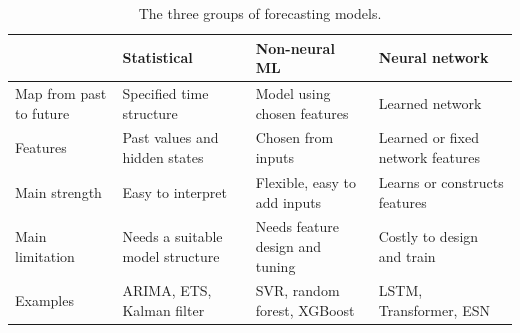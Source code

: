 \begin{table}[!htb]
\centering
\caption[Three groups of forecasting models]{The three groups of
forecasting models.}
\label{tab:model-groups}
\small
\begin{tabular}{@{}L{2.7cm}L{3.25cm}L{3.25cm}L{3.25cm}@{}}
\toprule
 & \textbf{Statistical} & \textbf{Non-neural ML} & \textbf{Neural network} \\
\midrule
Map from past to future
 & Specified time structure & Model using chosen features & Learned network \\
\addlinespace
Features
 & Past values and hidden states & Chosen from inputs & Learned or fixed network features \\
\addlinespace
Main strength
 & Easy to interpret & Flexible, easy to add inputs
 & Learns or constructs features \\
\addlinespace
Main limitation
 & Needs a suitable model structure & Needs feature design and tuning
 & Costly to design and train \\
\addlinespace
Examples
 & ARIMA, ETS, Kalman filter & SVR, random forest, XGBoost
 & LSTM, Transformer, ESN \\
\bottomrule
\end{tabular}
\end{table}
